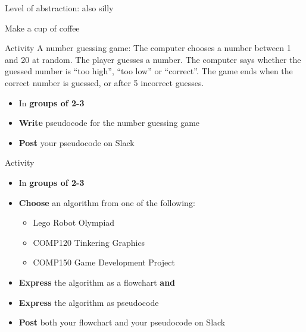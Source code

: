 \begin{frame}{Level of abstraction: also silly}
	\begin{algorithmic}
		\State Make a cup of coffee
	\end{algorithmic}
\end{frame}

\begin{frame}{Activity}
	A number guessing game: The computer chooses a number between 1 and 20 at random.
	The player guesses a number.
	The computer says whether the guessed number is ``too high'', ``too low'' or ``correct''.
	The game ends when the correct number is guessed, or after 5 incorrect guesses.

	\begin{itemize}
		\item In \textbf{groups of 2-3}
		\item \textbf{Write} pseudocode for the number guessing game
		\item \textbf{Post} your pseudocode on Slack
	\end{itemize}
\end{frame}

\begin{frame}{Activity}
	\begin{itemize}
		\item In \textbf{groups of 2-3}
		\item \textbf{Choose} an algorithm from one of the following:
			\begin{itemize}
				\item Lego Robot Olympiad
				\item COMP120 Tinkering Graphics
				\item COMP150 Game Development Project
			\end{itemize}
		\item \textbf{Express} the algorithm as a flowchart \textbf{and}
		\item \textbf{Express} the algorithm as pseudocode
		\item \textbf{Post} both your flowchart and your pseudocode on Slack
	\end{itemize}
\end{frame}
